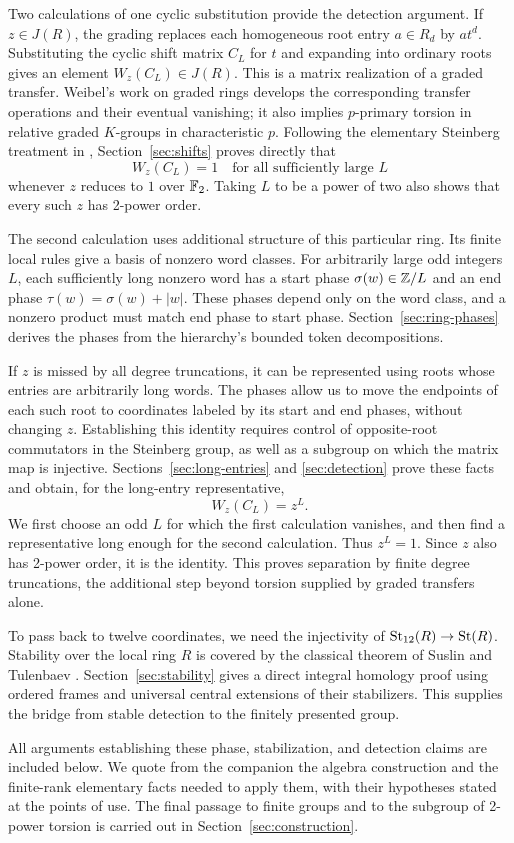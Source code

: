 Two calculations of one cyclic substitution provide the detection
argument. If $z\in J(R)$, the grading replaces each homogeneous root
entry $a\in R_d$ by $at^d$. Substituting the cyclic shift matrix $C_L$
for $t$ and expanding into ordinary roots gives an element
$W_z(C_L)\in J(R)$. This is a matrix realization of a graded transfer.
Weibel's work on graded rings \cite{Weibel1987} develops the
corresponding transfer operations and their eventual vanishing; it also
implies $p$-primary torsion in relative graded $K$-groups in
characteristic $p$. Following the elementary Steinberg treatment in
\cite{Companion}, Section~\ref{sec:shifts} proves directly that
\[
 W_z(C_L)=1\quad\text{for all sufficiently large }L
\]
whenever $z$ reduces to $1$ over $\mathbb F_2$. Taking $L$ to be a power of
two also shows that every such $z$ has 2-power order.

The second calculation uses additional structure of this particular
ring. Its finite local rules give a basis of nonzero word classes.
For arbitrarily large odd integers $L$, each sufficiently long nonzero
word has a start phase $\sigma(w)\in\mathbb Z/L$ and an end phase
$\tau(w)=\sigma(w)+|w|$. These phases depend only on the word class,
and a nonzero product must match end phase to start phase.
Section~\ref{sec:ring-phases} derives the phases from the hierarchy's
bounded token decompositions.

If $z$ is missed by all degree truncations, it can be represented using
roots whose entries are arbitrarily long words. The phases allow us
to move the endpoints of each such root to coordinates labeled by its
start and end phases, without changing $z$. Establishing this identity
requires control of opposite-root commutators in the Steinberg group,
as well as a subgroup on which the matrix map is injective.
Sections~\ref{sec:long-entries} and \ref{sec:detection} prove these
facts and obtain, for the long-entry representative,
\[
 W_z(C_L)=z^L.
\]
We first choose an odd $L$ for which the first calculation vanishes,
and then find a representative long enough for the second calculation.
Thus $z^L=1$. Since $z$ also has 2-power order, it is the identity.
This proves separation by finite degree truncations, the additional
step beyond torsion supplied by graded transfers alone.

To pass back to twelve coordinates, we need the injectivity of
$\operatorname{St}_{12}(R)\to\operatorname{St}(R)$. Stability over the local ring $R$ is
covered by the classical theorem of Suslin and Tulenbaev
\cite{SuslinTulenbaev1976}. Section~\ref{sec:stability} gives a
direct integral homology proof using ordered frames and universal
central extensions of their stabilizers. This supplies the bridge
from stable detection to the finitely presented group.

All arguments establishing these phase, stabilization, and detection
claims are included below. We quote from the companion the algebra
construction and the finite-rank elementary facts needed to apply them,
with their hypotheses stated at the points of use. The final passage
to finite groups and to the subgroup of 2-power torsion is carried out
in Section~\ref{sec:construction}.

